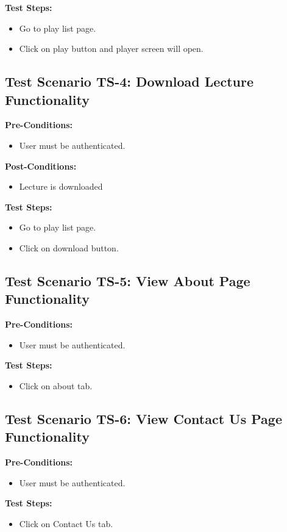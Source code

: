 \textbf{Test Steps:}
\begin{itemize}

\item Go to play list page.
\item Click on play button and player screen will open.

\end{itemize}


\subsection{Test Scenario TS-4: Download Lecture Functionality}

\textbf{Pre-Conditions: }
\begin{itemize}

\item User must be authenticated.

\end{itemize}


\textbf{Post-Conditions: }
\begin{itemize}

\item Lecture is downloaded

\end{itemize}


\textbf{Test Steps:}
\begin{itemize}

\item Go to play list page.
\item Click on download button.

\end{itemize}


\subsection{Test Scenario TS-5: View About Page Functionality}

\textbf{Pre-Conditions: }
\begin{itemize}

\item User must be authenticated.

\end{itemize}



\textbf{Test Steps:}
\begin{itemize}

\item Click on about tab.

\end{itemize}


\subsection{Test Scenario TS-6: View Contact Us Page Functionality}

\textbf{Pre-Conditions: }
\begin{itemize}

\item User must be authenticated.

\end{itemize}



\textbf{Test Steps:}
\begin{itemize}

\item Click on Contact Us tab.

\end{itemize}

